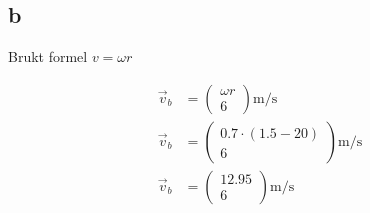 \subsection{b}

Brukt formel $v = \omega r$

\begin{align}
\vec{v}_b &= 
\begin{pmatrix} \omega r \\ 6 \end{pmatrix} \mathrm{m/s} \\[1em]
\vec{v}_b &= 
\begin{pmatrix} 0.7 \cdot (1.5 - 20) \\ 6 \end{pmatrix} \mathrm{m/s} \\[1em]
\vec{v}_b &= 
\begin{pmatrix} 12.95 \\ 6 \end{pmatrix} \mathrm{m/s}
\end{align}